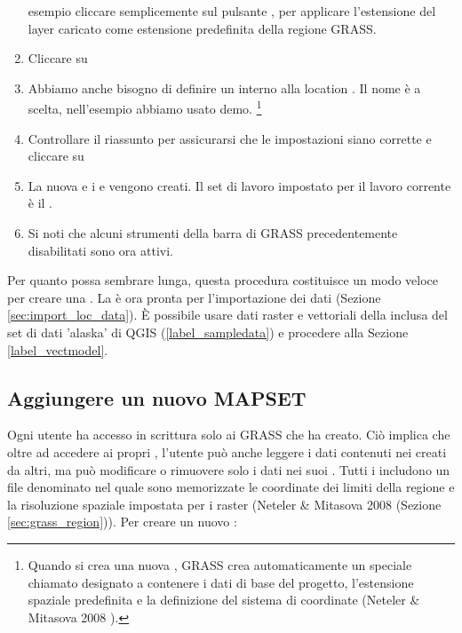 \begin{enumerate}
  esempio cliccare semplicemente sul pulsante , per applicare l'estensione del layer caricato
   come estensione predefinita della regione GRASS.
  \item Cliccare su  
  \item Abbiamo anche bisogno di definire un  interno alla
  location . Il nome è a scelta, nell'esempio abbiamo
  usato demo.
  \footnote{Quando si crea una nuova , GRASS crea
  automaticamente un  speciale chiamato 
  designato a contenere i dati di base del progetto, l'estensione spaziale predefinita 
  e la definizione del sistema di coordinate (Neteler \& Mitasova 2008 
  \cite{neteler_mitasova08}).}
  \item Controllare il riassunto per assicurarsi che le impostazioni siano
  corrette e cliccare su  
  \item La nuova  e i 
  e  vengono creati. Il set di lavoro impostato per il
  lavoro corrente è il .
  \item Si noti che alcuni strumenti della barra di GRASS precedentemente
  disabilitati sono ora attivi.
\end{enumerate}

Per quanto possa sembrare lunga, questa procedura costituisce un modo
veloce per creare una . La  è ora
pronta per l'importazione dei dati (Sezione \ref{sec:import_loc_data}).
È possibile usare dati raster e vettoriali della
 inclusa del set di dati 'alaska' di QGIS (\ref{label_sampledata})
e procedere alla Sezione \ref{label_vectmodel}.

\subsection{Aggiungere un nuovo MAPSET}\label{sec:add_mapset}

Ogni utente ha accesso in scrittura solo ai  GRASS che ha
creato. Ciò implica che oltre ad accedere ai propri ,
l'utente può anche leggere i dati contenuti nei  creati da
altri, ma può modificare o rimuovere solo i dati nei suoi .
Tutti i  includono un file denominato  nel
quale sono memorizzate le coordinate dei limiti della regione e la risoluzione 
spaziale impostata per i raster (Neteler \& Mitasova 2008
\cite{neteler_mitasova08} (Sezione \ref{sec:grass_region})). 
Per creare un nuovo :

